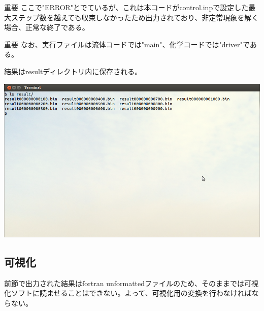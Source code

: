 \documentclass{jsarticle}
\begin{document}
\begin{itembox}[l]{重要}
ここで"ERROR"とでているが、これは本コードがcontrol.inpで設定した最大ステップ数を越えても収束しなかったため出力されており、非定常現象を解く場合、正常な終了である。
\end{itembox}
\begin{itembox}[l]{重要}
なお、実行ファイルは流体コードでは"main"、化学コードでは"driver"である。
\end{itembox}

結果はresultディレクトリ内に保存される。
\begin{center}
\includegraphics[width=.8\textwidth,bb=0 0 962 577]{tutorial_img/210.png}
\end{center}

\subsection{可視化}
前節で出力された結果はfortran unformattedファイルのため、そのままでは可視化ソフトに読ませることはできない。よって、可視化用の変換を行わなければならない。
\end{document}
